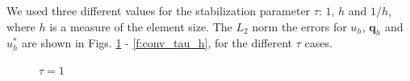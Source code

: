\documentclass[10pt,a4paper]{article}
\begin{document}
We used three different values for the stabilization parameter $\tau$: $1$, $h$ and $1/h$, where $h$ is a measure of the element size.
The $L_2$ norm the errors for $u_h$, $\mathbf{q}_h$ and $u^*_h$ are shown in Figs. \ref{f:conv_tau_1} - \ref{f:conv_tau_h}, for the different $\tau$ cases.
\begin{figure}[H]
    \centering
    \caption{$\tau = 1$}
    \label{f:conv_tau_1}
\end{figure}
\end{document}
